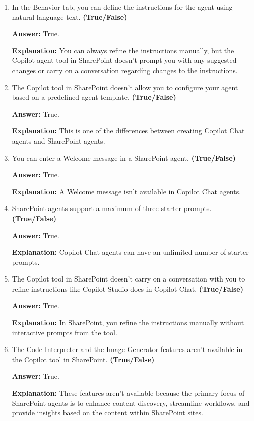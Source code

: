 \documentclass[10pt]{article}
\begin{document}
\begin{enumerate}[leftmargin=*]
\item In the Behavior tab, you can define the instructions for the agent using natural language text. \textbf{(True/False)}

\textbf{Answer:} True.

\textbf{Explanation:} You can always refine the instructions manually, but the Copilot agent tool in SharePoint doesn't prompt you with any suggested changes or carry on a conversation regarding changes to the instructions.

\item The Copilot tool in SharePoint doesn't allow you to configure your agent based on a predefined agent template. \textbf{(True/False)}

\textbf{Answer:} True.

\textbf{Explanation:} This is one of the differences between creating Copilot Chat agents and SharePoint agents.

\item You can enter a Welcome message in a SharePoint agent. \textbf{(True/False)}

\textbf{Answer:} True.

\textbf{Explanation:} A Welcome message isn't available in Copilot Chat agents.

\item SharePoint agents support a maximum of three starter prompts. \textbf{(True/False)}

\textbf{Answer:} True.

\textbf{Explanation:} Copilot Chat agents can have an unlimited number of starter prompts.

\item The Copilot tool in SharePoint doesn't carry on a conversation with you to refine instructions like Copilot Studio does in Copilot Chat. \textbf{(True/False)}

\textbf{Answer:} True.

\textbf{Explanation:} In SharePoint, you refine the instructions manually without interactive prompts from the tool.

\item The Code Interpreter and the Image Generator features aren't available in the Copilot tool in SharePoint. \textbf{(True/False)}

\textbf{Answer:} True.

\textbf{Explanation:} These features aren't available because the primary focus of SharePoint agents is to enhance content discovery, streamline workflows, and provide insights based on the content within SharePoint sites.


\end{enumerate}
\end{document}

